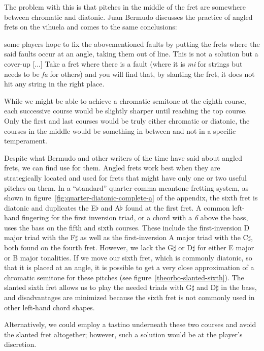 The problem with this is that pitches in the middle of the fret are somewhere between
chromatic and diatonic. Juan Bermudo discusses the practice of angled frets on the
vihuela and comes to the same conclusions:
\begin{blocks}
[...] some players hope to fix the abovementioned faults by putting the frets where the
said faults occur at an angle, taking them out of line. This is not a solution but a
cover-up [...] Take a fret where there is a fault (where it is \textit{mi} for strings
but needs to be \textit{fa} for others) and you will find that, by slanting the fret,
it does not hit any string in the right place. \autocite[112-113]{DE:1}
\end{blocks}
While we might be able to achieve a chromatic semitone at the eighth course, each
successive course would be slightly sharper until reaching the top course. Only the
first and last courses would be truly either chromatic or diatonic, the courses in the
middle would be something in between and not in a specific temperament.

Despite what Bermudo and other writers of the time have said about angled frets, we can
find use for them. Angled frets work best when they are strategically located and used
for frets that might have only one or two useful pitches on them. In a ``standard''
quarter-comma meantone fretting system, as shown in
figure~\ref{fig:quarter-diatonic-complete-a} of the appendix, the sixth fret is diatonic
and duplicates the E$\flat$ and A$\flat$ found at the first fret. A common left-hand
fingering for the first inversion triad, or a chord with a \textit{6} above the bass,
uses the bass on the fifth and sixth courses. These include the first-inversion D major
triad with the F$\sharp$ as well as the first-inversion A major triad with the
C$\sharp$, both found on the fourth fret. However, we lack the G$\sharp$ or D$\sharp$
for either E major or B major tonalities. If we move our sixth fret, which is commonly
diatonic, so that it is placed at an angle, it is possible to get a very close
approximation of a chromatic semitone for these pitches (see
figure~\ref{theorbo-slanted-sixth}). The slanted sixth fret allows us to play the
needed triads with G$\sharp$ and D$\sharp$ in the bass, and disadvantages are minimized
because the sixth fret is not commonly used in other left-hand chord shapes.

Alternatively, we could employ a tastino underneath these two courses and avoid the
slanted fret altogether; however, such a solution would be at the player's discretion.

